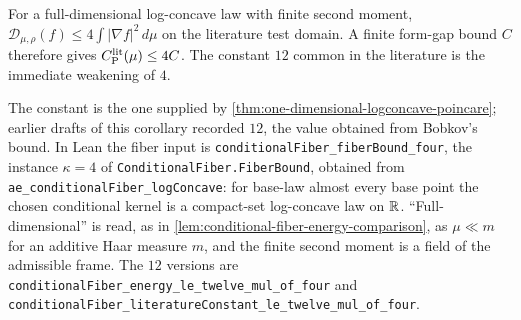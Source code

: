\begin{corollary}
  \label{cor:conditional-fiber-twelve-bound}
  \leanok
  For a full-dimensional log-concave law with finite second moment,
  $\mathcal D_{\mu,\rho}(f)\le4\int|\nabla f|^2\,d\mu$ on the literature test domain.
  A finite form-gap bound $C$ therefore gives $C_{\mathrm P}^{\mathrm{lit}}(\mu)\le4C$.  The constant $12$ common in
  the literature is the immediate weakening of $4$.

  The constant is the one supplied by \cref{thm:one-dimensional-logconcave-poincare}; earlier
  drafts of this corollary recorded $12$, the value obtained from Bobkov's bound.  In Lean the
  fiber input is \texttt{conditionalFiber\_fiberBound\_four}, the instance $\kappa=4$ of
  \texttt{ConditionalFiber.FiberBound}, obtained from
  \texttt{ae\_conditionalFiber\_logConcave}: for base-law almost every base point the chosen
  conditional kernel is a compact-set log-concave law on $\mathbb{R}$.  ``Full-dimensional'' is read, as
  in \cref{lem:conditional-fiber-energy-comparison}, as $\mu\ll m$ for an additive Haar measure
  $m$, and the finite second moment is a field of the admissible frame.  The $12$ versions are
  \texttt{conditionalFiber\_energy\_le\_twelve\_mul\_of\_four} and
  \texttt{conditionalFiber\_literatureConstant\_le\_twelve\_mul\_of\_four}.
\end{corollary}
